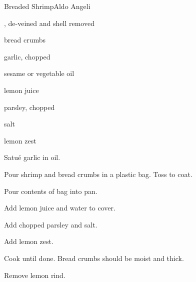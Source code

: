 \begin{recipe}{Breaded Shrimp}{Aldo Angeli}{}

\begin{ingredients}
\item {}, de-veined and shell removed
\item bread crumbs
\item garlic, chopped
\item sesame or vegetable oil
\item lemon juice
\item parsley, chopped
\item salt
\item lemon zest
\end{ingredients}

\begin{directions}
\item Satu\'e garlic in oil.
\item Pour shrimp and bread crumbs in a plastic bag. Toss to coat.
\item Pour contents of bag into pan.
\item Add lemon juice and water to cover.
\item Add chopped parsley and salt.
\item Add lemon zest.
\item Cook until done. Bread crumbs should be moist and thick.
\item Remove lemon rind.
\end{directions}

\end{recipe}
